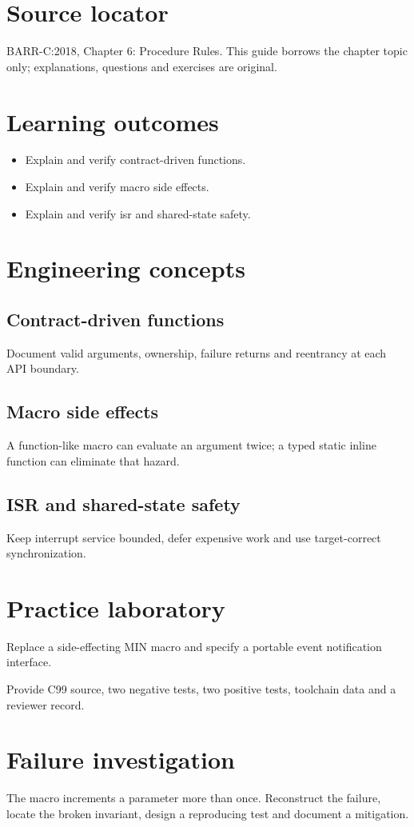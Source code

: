 \documentclass[10pt,letterpaper]{article}
\begin{document}
\makedoctitle
\makedocsummary
\section{Source locator}
BARR-C:2018, Chapter 6: Procedure Rules. This guide borrows the chapter topic only; explanations, questions and exercises are original.
\section{Learning outcomes}
\begin{itemize}
\item Explain and verify contract-driven functions.
\item Explain and verify macro side effects.
\item Explain and verify isr and shared-state safety.
\end{itemize}

\section{Engineering concepts}
\subsection{Contract-driven functions}
Document valid arguments, ownership, failure returns and reentrancy at each API boundary.

\subsection{Macro side effects}
A function-like macro can evaluate an argument twice; a typed static inline function can eliminate that hazard.

\subsection{ISR and shared-state safety}
Keep interrupt service bounded, defer expensive work and use target-correct synchronization.

\section{Practice laboratory}
Replace a side-effecting MIN macro and specify a portable event notification interface.

Provide C99 source, two negative tests, two positive tests, toolchain data and a reviewer record.
\section{Failure investigation}
The macro increments a parameter more than once. Reconstruct the failure, locate the broken invariant, design a reproducing test and document a mitigation.
\end{document}
